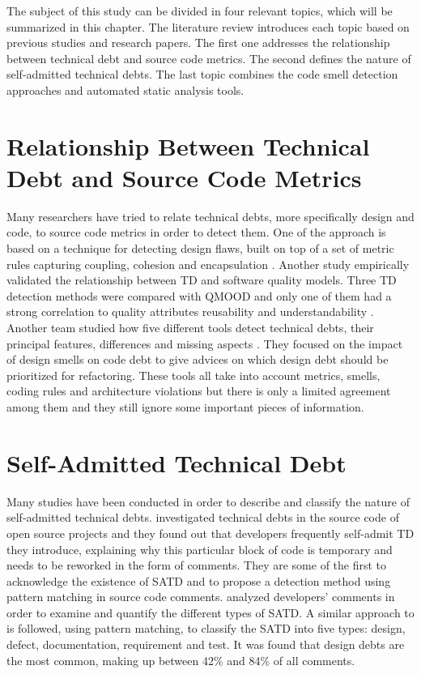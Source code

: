 \label{sec:RevLitt}


\setlength{\parindent}{5ex}The subject of this study can be divided in four relevant topics, which will be summarized in this chapter. The literature review introduces each topic based on previous studies and research papers. The first one addresses the relationship between technical debt and source code metrics. The second defines the nature of self-admitted technical debts. The last topic combines the code smell detection approaches and automated static analysis tools.

\section{Relationship Between Technical Debt and Source Code Metrics}

Many researchers have tried to relate technical debts, more specifically design and code, to source code metrics in order to detect them. One of the approach is based on a technique for detecting design flaws, built on top of a set of metric rules capturing coupling, cohesion and encapsulation \citep{marinescu2012assessing}. Another study empirically validated the relationship between \ac{TD} and software quality models. Three \ac{TD} detection methods were compared with \ac{QMOOD} \citep{bansiya2002hierarchical} and only one of them had a strong correlation to quality attributes reusability and understandability \citep{griffith2014correspondence}. Another team studied how five different tools detect technical debts, their principal features, differences and missing aspects \citep{fontana2016technical}. They focused on the impact of design smells on code debt to give advices on which design debt should be prioritized for refactoring. These tools all take into account metrics, smells, coding rules and architecture violations but there is only a limited agreement among them and they still ignore some important pieces of information.

\section{Self-Admitted Technical Debt}

Many studies have been conducted in order to describe and classify the nature of self-admitted technical debts. \citet{PotdarS14} investigated technical debts in the source code of open source projects and they found out that developers frequently self-admit \ac{TD} they introduce, explaining why this particular block of code is temporary and needs to be reworked in the form of comments. They are some of the first to acknowledge the existence of \ac{SATD} and to propose a detection method using pattern matching in source code comments. \citet{MaldonadoS15} analyzed developers' comments in order to examine and quantify the different types of \ac{SATD}. A similar approach to \citet{PotdarS14} is followed, using pattern matching, to classify the \ac{SATD} into five types: design, defect, documentation, requirement and test. It was found that design debts are the most common, making up between 42\% and 84\% of all comments. \par

